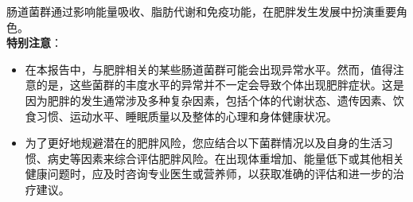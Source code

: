 \documentclass[UTF8]{ctexart}
\begin{document}
\begin{tcolorbox}[
    enhanced,
    colback=customTealBg,
    colframe=customTealBg,
    arc=3mm,
    boxrule=0pt,
    width=\textwidth,
    top=8pt,
    bottom=8pt
]
{\small{\color{customTeal}\faInfoCircle}
肠道菌群通过影响能量吸收、脂肪代谢和免疫功能，在肥胖发生发展中扮演重要角色。\\

{\color{orange}\faExclamationTriangle} \textbf{特别注意}：
\begin{itemize}
    \item 在本报告中，与肥胖相关的某些肠道菌群可能会出现异常水平。然而，值得注意的是，这些菌群的丰度水平的异常并不一定会导致个体出现肥胖症状。这是因为肥胖的发生通常涉及多种复杂因素，包括个体的代谢状态、遗传因素、饮食习惯、运动水平、睡眠质量以及整体的心理和身体健康状况。 \item 为了更好地规避潜在的肥胖风险，您应结合以下菌群情况以及自身的生活习惯、病史等因素来综合评估肥胖风险。在出现体重增加、能量低下或其他相关健康问题时，应及时咨询专业医生或营养师，以获取准确的评估和进一步的治疗建议。
\end{itemize}
}
\end{tcolorbox}
\vspace{-0.7cm}
\end{document}
